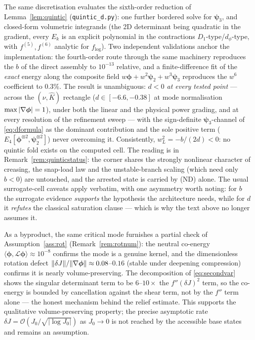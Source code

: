The same discretisation evaluates the sixth-order reduction of Lemma~\ref{lem:quintic}
(\texttt{quintic\_d.py}): one further bordered solve for $\bm\psi_3$, and closed-form volumetric integrands (the 2D
determinant being quadratic in the gradient, every $E_k$ is an explicit polynomial in the contractions
$D_1$-type/$d_\phi$-type, with $f^{(5)},f^{(6)}$ analytic for $f_{\log}$). Two independent validations anchor the
implementation: the fourth-order route through the same machinery reproduces the $b$ of the direct assembly to
$10^{-13}$ relative, and a finite-difference fit of the \emph{exact} energy along the composite field
$w\bm\phi+w^2\bm\psi_2+w^3\bm\psi_3$ reproduces the $w^6$ coefficient to $0.3\%$. The result is unambiguous:
\emph{$d<0$ at every tested point} --- across the $(\nu,\hat K)$ rectangle ($d\in[-6.6,-0.38]$ at mode normalisation
$\max|\nabla\bm\phi|=1$), under both the linear and the physical power grading, and at every resolution of the
refinement sweep --- with the sign-definite $\bm\psi_3$-channel of \eqref{eq:dformula} as the dominant contribution
and the sole positive term ($E_4[\bm\phi^{\otimes2},\bm\psi_2^{\otimes2}]$) never overcoming it. Consistently,
$w_L^2=-b/(2d)<0$: no quintic fold exists on the computed cell. The reading is in
Remark~\ref{rem:quinticstatus}: the corner shares the strongly nonlinear character of creasing, the snap-load law and
the unstable-branch scaling (which need only $b<0$) are untouched, and the arrested state is carried by (ND) alone.
The usual surrogate-cell caveats apply verbatim, with one asymmetry worth noting: for $b$ the surrogate evidence
\emph{supports} the hypothesis the architecture needs, while for $d$ it \emph{refutes} the classical saturation
clause --- which is why the text above no longer assumes it.

As a byproduct, the same critical mode furnishes a partial check of Assumption~\ref{ass:rot}
(Remark~\ref{rem:rotnum}): the neutral co-energy $\langle\bm\phi,\mathcal L\bm\phi\rangle\approx10^{-8}$ confirms the
mode is a genuine kernel, and the dimensionless rotation defect $\|\delta J\|/\|\nabla\bm\phi\|\approx0.08$--$0.16$ (stable
under deepening compression) confirms it is nearly volume-preserving. The decomposition of \eqref{eq:secondvar} shows the
singular determinant term to be $6$--$10\times$ the $f''(\delta J)^2$ term, so the co-energy is bounded by cancellation
against the shear term, not by the $f''$ term alone --- the honest mechanism behind the relief estimate. This supports
the qualitative volume-preserving property; the precise asymptotic rate $\delta J=\mathcal{O}(J_0/\sqrt{|\log J_0|})$ as
$J_0\to0$ is not reached by the accessible base states and remains an assumption.
